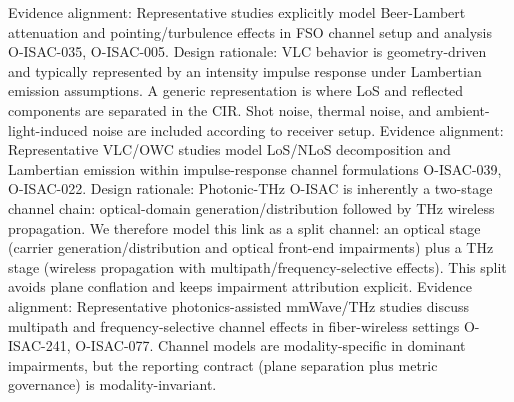 {}Evidence alignment: Representative studies explicitly model Beer-Lambert attenuation and pointing/turbulence effects in FSO channel setup and analysis O-ISAC-035, O-ISAC-005.\markdownRendererInterblockSeparator
{}
\markdownRendererSectionEnd \markdownRendererSectionBegin
{}\markdownRendererInterblockSeparator
{}Design rationale: VLC behavior is geometry-driven and typically represented by an intensity impulse response under Lambertian emission assumptions.\markdownRendererParagraphSeparator
{}A generic representation is\markdownRendererSoftLineBreak
{}\markdownRendererSoftLineBreak
{}where LoS and reflected components are separated in the CIR. Shot noise, thermal noise, and ambient-light-induced noise are included according to receiver setup.\markdownRendererParagraphSeparator
{}Evidence alignment: Representative VLC/OWC studies model LoS/NLoS decomposition and Lambertian emission within impulse-response channel formulations O-ISAC-039, O-ISAC-022.\markdownRendererInterblockSeparator
{}
\markdownRendererSectionEnd \markdownRendererSectionBegin
{}\markdownRendererInterblockSeparator
{}Design rationale: Photonic-THz O-ISAC is inherently a two-stage channel chain: optical-domain generation/distribution followed by THz wireless propagation.\markdownRendererParagraphSeparator
{}We therefore model this link as a split channel: an optical stage (carrier generation/distribution and optical front-end impairments) plus a THz stage (wireless propagation with multipath/frequency-selective effects). This split avoids plane conflation and keeps impairment attribution explicit.\markdownRendererParagraphSeparator
{}Evidence alignment: Representative photonics-assisted mmWave/THz studies discuss multipath and frequency-selective channel effects in fiber-wireless settings O-ISAC-241, O-ISAC-077.\markdownRendererParagraphSeparator
{} Channel models are modality-specific in dominant impairments, but the reporting contract (plane separation plus metric governance) is modality-invariant.\markdownRendererInterblockSeparator
{}\markdownRendererThematicBreak{}\markdownRendererInterblockSeparator
{}
\markdownRendererSectionEnd 
\markdownRendererSectionEnd \markdownRendererSectionBegin
{}\markdownRendererInterblockSeparator
